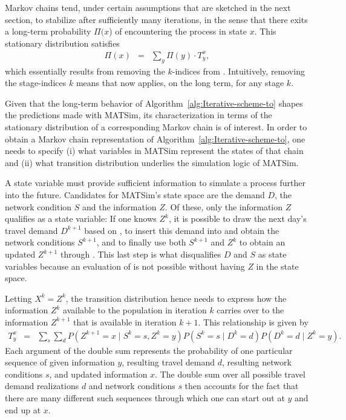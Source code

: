 Markov chains tend, under certain assumptions that are sketched in
the next section, to stabilize after sufficiently many iterations,
in the sense that there exits a long-term probability $\Pi(x$) of
encountering the process in state $x$. This stationary distribution
satisfies
\begin{eqnarray}
\Pi(x) & = & \sum_{y}\Pi(y)\cdot T_{y}^{x},\label{eq:mc-stationary}
\end{eqnarray}
which essentially results from removing the $k$-indices from .
Intuitively, removing the stage-indices $k$ means that 
now applies, on the long term, for any stage $k$.

Given that the long-term behavior of Algorithm~\ref{alg:Iterative-scheme-to}
shapes the predictions made with MATSim, its characterization in terms
of the stationary distribution of a corresponding Markov chain is
of interest. In order to obtain a Markov chain representation of Algorithm~\ref{alg:Iterative-scheme-to},
one needs to specify (i) what variables in MATSim represent the states
of that chain and (ii) what transition distribution underlies the
simulation logic of MATSim.

A state variable must provide sufficient information to simulate a
process further into the future. Candidates for MATSim's state space
are the demand $D$, the network condition $S$ and the information
$Z$. Of these, only the information $Z$ qualifies as a state variable:
If one knows $Z^{k}$, it is possible to draw the next day's travel
demand $D^{k+1}$ based on , to insert this
demand into  and obtain the network
conditions $S^{k+1}$, and to finally use both $S^{k+1}$ and $Z^{k}$
to obtain an updated $Z^{k+1}$ through .
This last step is what disqualifies $D$ and $S$ as state variables
because an evaluation of  is not possible
without having $Z$ in the state space.

Letting $X^{k}=Z^{k}$, the transition distribution hence needs to
express how the information $Z^{k}$ available to the population in
iteration $k$ carries over to the information $Z^{k+1}$ that is
available in iteration $k+1$. This relationship is given by
\begin{eqnarray}
T_{y}^{x} & = & \sum_{s}\sum_{d}P(Z^{k+1}=x\mid S^{k}=s,Z^{k}=y)P(S^{k}=s\mid D^{k}=d)P(D^{k}=d\mid Z^{k}=y).\label{eq:matsim-transition-distr}
\end{eqnarray}
Each argument of the double sum represents the probability of one
particular sequence of given information $y$, resulting travel demand
$d$, resulting network conditions $s$, and updated information $x$.
The double sum over all possible travel demand realizations $d$ and
network conditions $s$ then accounts for the fact that there are
many different such sequences through which one can start out at $y$
and end up at $x$.

